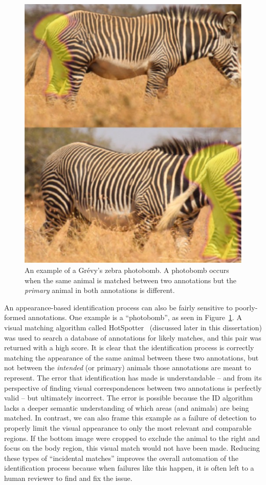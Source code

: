 \begin{figure}[!t]
    \begin{center}
        \includegraphics[width=0.6\linewidth]{resources/photobomb.pdf}
    \end{center}
    \caption{An example of a Gr\'evy's zebra photobomb.  A photobomb occurs when the same animal is matched between two annotations but the \textit{primary} animal in both annotations is different.}
    \label{fig:photobomb-overview}
\end{figure}

An appearance-based identification process can also be fairly sensitive to poorly-formed annotations. One example is a ``photobomb'', as seen in Figure~\ref{fig:photobomb-overview}.  A visual matching algorithm called HotSpotter~\cite{crall_identifying_2017} (discussed later in this dissertation) was used to search a database of annotations for likely matches, and this pair was returned with a high score.  It is clear that the identification process is correctly matching the appearance of the same animal between these two annotations, but not between the \textit{intended} (or primary) animals those annotations are meant to represent.  The error that identification has made is understandable -- and from its perspective of finding visual correspondences between two annotations is perfectly valid -- but ultimately incorrect.  The error is possible because the ID algorithm lacks a deeper semantic understanding of which areas (and animals) are being matched.  In contrast, we can also frame this example as a failure of detection to properly limit the visual appearance to only the most relevant and comparable regions.  If the bottom image were cropped to exclude the animal to the right and focus on the body region, this visual match would not have been made.  Reducing these types of ``incidental matches'' improves the overall automation of the identification process because when failures like this happen, it is often left to a human reviewer to find and fix the issue.

